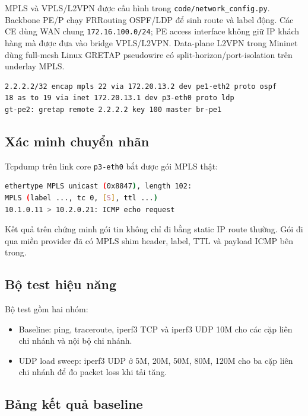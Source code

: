 MPLS và VPLS/L2VPN được cấu hình trong \texttt{code/network\_config.py}. Backbone PE/P chạy FRRouting OSPF/LDP để sinh route và label động. Các CE dùng WAN chung \texttt{172.16.100.0/24}; PE access interface không giữ IP khách hàng mà được đưa vào bridge VPLS/L2VPN. Data-plane L2VPN trong Mininet dùng full-mesh Linux GRETAP pseudowire có split-horizon/port-isolation trên underlay MPLS.

\begin{lstlisting}[language=bash, caption={Ví dụ route MPLS đã sinh trong kết quả}]
2.2.2.2/32 encap mpls 22 via 172.20.13.2 dev pe1-eth2 proto ospf
18 as to 19 via inet 172.20.13.1 dev p3-eth0 proto ldp
gt-pe2: gretap remote 2.2.2.2 key 100 master br-pe1
\end{lstlisting}

\subsection{Xác minh chuyển nhãn}

Tcpdump trên link core \texttt{p3-eth0} bắt được gói MPLS thật:

\begin{lstlisting}[language=bash, caption={Trích tcpdump MPLS}]
ethertype MPLS unicast (0x8847), length 102:
MPLS (label ..., tc 0, [S], ttl ...)
10.1.0.11 > 10.2.0.21: ICMP echo request
\end{lstlisting}

Kết quả trên chứng minh gói tin không chỉ đi bằng static IP route thường. Gói đi qua miền provider đã có MPLS shim header, label, TTL và payload ICMP bên trong.

\subsection{Bộ test hiệu năng}

Bộ test gồm hai nhóm:
\begin{itemize}
    \item Baseline: ping, traceroute, iperf3 TCP và iperf3 UDP 10M cho các cặp liên chi nhánh và nội bộ chi nhánh.
    \item UDP load sweep: iperf3 UDP ở 5M, 20M, 50M, 80M, 120M cho ba cặp liên chi nhánh để đo packet loss khi tải tăng.
\end{itemize}

\subsection{Bảng kết quả baseline}

